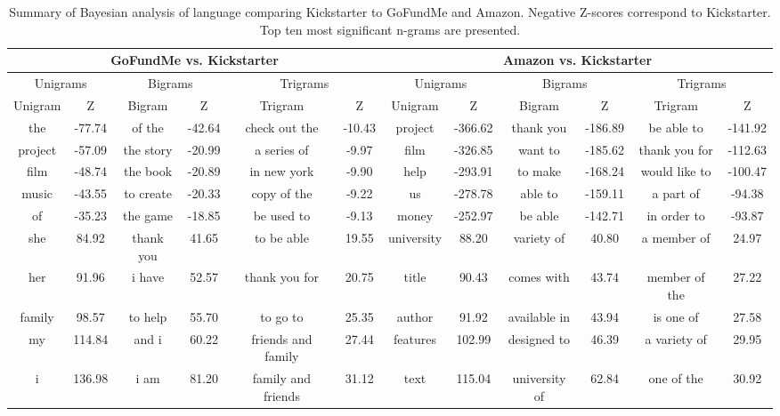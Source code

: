 \documentclass[letterpaper]{article}
\begin{document}
\begin{table}[t]
\centering
\scriptsize
\begin{tabular}{|*{12}{c|}}  %
\hline
\multicolumn{6}{|c}{GoFundMe vs. Kickstarter} & \multicolumn{6}{|c|}{Amazon vs. Kickstarter} \\ \hline
\multicolumn{2}{|c}{Unigrams} & \multicolumn{2}{|c}{Bigrams} & \multicolumn{2}{|c}{Trigrams} & 
\multicolumn{2}{|c}{Unigrams} & \multicolumn{2}{|c}{Bigrams} & \multicolumn{2}{|c|}{Trigrams} \\ \hline 
Unigram & Z & Bigram & Z & Trigram & Z & Unigram & Z & Bigram & Z & Trigram & Z \\ \hline
the & -77.74 & of the & -42.64 & check out the & -10.43 &
project & -366.62 & thank you & -186.89 & be able to & -141.92 \\ \hline
project & -57.09 & the story & -20.99 & a series of & -9.97 &
film & -326.85 & want to & -185.62 & thank you for & -112.63 \\ \hline
film & -48.74 & the book & -20.89 & in new york & -9.90 &
help & -293.91 & to make & -168.24 & would like to & -100.47 \\ \hline
music & -43.55 & to create & -20.33 & copy of the & -9.22 &
us & -278.78 & able to & -159.11 & a part of & -94.38 \\ \hline
of & -35.23 & the game & -18.85 & be used to & -9.13 &
money & -252.97 & be able & -142.71 & in order to & -93.87 \\ \hline \hline
she & 84.92 & thank you & 41.65 & to be able & 19.55 &
university & 88.20 & variety of & 40.80 & a member of & 24.97\\ \hline
her & 91.96 & i have & 52.57 & thank you for & 20.75 &
title & 90.43 & comes with & 43.74 & member of the & 27.22 \\ \hline
family & 98.57 & to help & 55.70 & to go to & 25.35 &
author & 91.92 & available in & 43.94 & is one of & 27.58 \\ \hline
my & 114.84 & and i & 60.22 & friends and family & 27.44 &
features & 102.99 & designed to & 46.39 & a variety of & 29.95 \\ \hline
i & 136.98 & i am & 81.20 & family and friends & 31.12 &
text & 115.04 & university of & 62.84 & one of the & 30.92 \\ \hline
\end{tabular}
\caption{Summary of Bayesian analysis of language comparing Kickstarter to GoFundMe and Amazon. Negative Z-scores correspond to Kickstarter. Top ten most significant n-grams are presented.}
\label{tab:pairwise}
\end{table}
\end{document}
